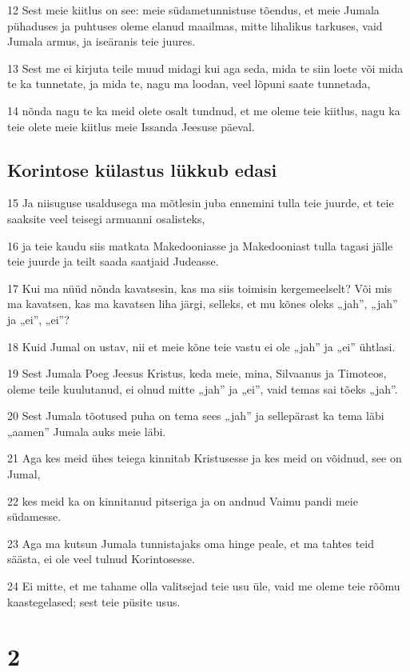 \par 12 Sest meie kiitlus on see: meie südametunnistuse tõendus, et meie Jumala pühaduses ja puhtuses oleme elanud maailmas, mitte lihalikus tarkuses, vaid Jumala armus, ja iseäranis teie juures.
\par 13 Sest me ei kirjuta teile muud midagi kui aga seda, mida te siin loete või mida te ka tunnetate, ja mida te, nagu ma loodan, veel lõpuni saate tunnetada,
\par 14 nõnda nagu te ka meid olete osalt tundnud, et me oleme teie kiitlus, nagu ka teie olete meie kiitlus meie Issanda Jeesuse päeval.

\section*{Korintose külastus lükkub edasi}

\par 15 Ja niisuguse usaldusega ma mõtlesin juba ennemini tulla teie juurde, et teie saaksite veel teisegi armuanni osalisteks,
\par 16 ja teie kaudu siis matkata Makedooniasse ja Makedooniast tulla tagasi jälle teie juurde ja teilt saada saatjaid Judeasse.
\par 17 Kui ma nüüd nõnda kavatsesin, kas ma siis toimisin kergemeelselt? Või mis ma kavatsen, kas ma kavatsen liha järgi, selleks, et mu kõnes oleks „jah”, „jah” ja „ei”, „ei”?
\par 18 Kuid Jumal on ustav, nii et meie kõne teie vastu ei ole „jah” ja „ei” ühtlasi.
\par 19 Sest Jumala Poeg Jeesus Kristus, keda meie, mina, Silvaanus ja Timoteos, oleme teile kuulutanud, ei olnud mitte „jah” ja „ei”, vaid temas sai tõeks „jah”.
\par 20 Sest Jumala tõotused puha on tema sees „jah” ja sellepärast ka tema läbi „aamen” Jumala auks meie läbi.
\par 21 Aga kes meid ühes teiega kinnitab Kristusesse ja kes meid on võidnud, see on Jumal,
\par 22 kes meid ka on kinnitanud pitseriga ja on andnud Vaimu pandi meie südamesse.
\par 23 Aga ma kutsun Jumala tunnistajaks oma hinge peale, et ma tahtes teid säästa, ei ole veel tulnud Korintosesse.
\par 24 Ei mitte, et me tahame olla valitsejad teie usu üle, vaid me oleme teie rõõmu kaastegelased; sest teie püsite usus.


\chapter{2}

